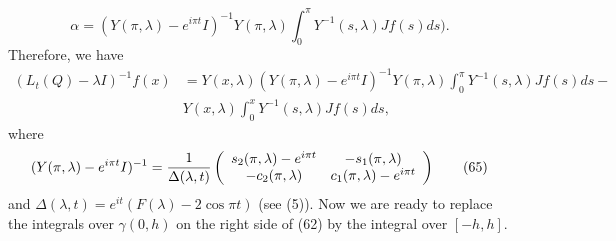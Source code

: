 \documentclass{article}%
\begin{document}
\[
\alpha=(Y(\pi,\lambda)-e^{i\pi t}I)^{-1}Y(\pi,\lambda)\int_{0}^{\pi}%
Y^{-1}(s,\lambda)Jf(s)ds).
\]
Therefore, we have
\begin{align}
\left(  L_{t}(Q)-\lambda I\right)  ^{-1}f(x)  &  =Y(x,\lambda)(Y(\pi
,\lambda)-e^{i\pi t}I)^{-1}Y(\pi,\lambda)\int_{0}^{\pi}Y^{-1}(s,\lambda
)Jf(s)ds-\tag{64}\\
&  Y(x,\lambda)\int_{0}^{x}Y^{-1}(s,\lambda)Jf(s)ds,\nonumber
\end{align}
where
\begin{equation}
(Y(\pi,\lambda)-e^{i\pi t}I)^{-1}=\frac{1}{\Delta(\lambda,t)}\left(
\begin{array}
[c]{cc}%
s_{2}(\pi,\lambda)-e^{i\pi t} & -s_{1}(\pi,\lambda)\\
-c_{2}(\pi,\lambda) & c_{1}(\pi,\lambda)-e^{i\pi t}%
\end{array}
\right)  \tag{65}%
\end{equation}
and $\Delta(\lambda,t)=e^{it}(F(\lambda)-2\cos\pi t)$ (see (5)). Now we are
ready to replace the integrals over $\gamma(0,h)$ on the right side of (62) by
the integral over $[-h,h].$
\end{document}
